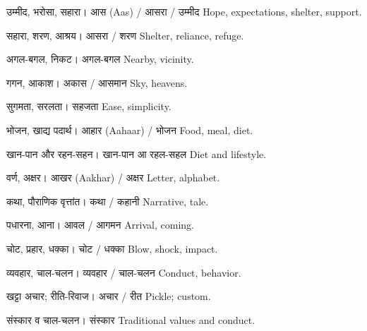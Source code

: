 %
{उम्मीद, भरोसा, सहारा।}%
{आस (Aas) / आसरा / उम्मीद}%
{Hope, expectations, shelter, support.}

%
{सहारा, शरण, आश्रय।}%
{आसरा / शरण}%
{Shelter, reliance, refuge.}

%
{अगल-बगल, निकट।}%
{अगल-बगल}%
{Nearby, vicinity.}

%
{गगन, आकाश।}%
{अकास / आसमान}%
{Sky, heavens.}

%
{सुगमता, सरलता।}%
{सहजता}%
{Ease, simplicity.}

%
{भोजन, खाद्य पदार्थ।}%
{आहार (Aahaar) / भोजन}%
{Food, meal, diet.}

%
{खान-पान और रहन-सहन।}%
{खान-पान आ रहल-सहल}%
{Diet and lifestyle.}

%
{वर्ण, अक्षर।}%
{आखर (Aakhar) / अक्षर}%
{Letter, alphabet.}

%
{कथा, पौराणिक वृत्तांत।}%
{कथा / कहानी}%
{Narrative, tale.}

%
{पधारना, आना।}%
{आवल / आगमन}%
{Arrival, coming.}

%
{चोट, प्रहार, धक्का।}%
{चोट / धक्का}%
{Blow, shock, impact.}

%
{व्यवहार, चाल-चलन।}%
{व्यवहार / चाल-चलन}%
{Conduct, behavior.}

%
{खट्टा अचार; रीति-रिवाज।}%
{अचार / रीत}%
{Pickle; custom.}

%
{संस्कार व चाल-चलन।}%
{संस्कार}%
{Traditional values and conduct.}

